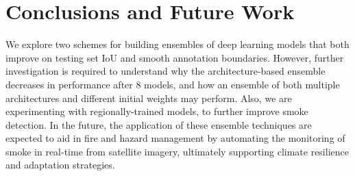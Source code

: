 \documentclass{article}
\begin{document}
\section{Conclusions and Future Work} We explore two schemes for building ensembles of deep learning models that both improve on testing set IoU and smooth annotation boundaries. However, further investigation is required to understand why the architecture-based ensemble decreases in performance after 8 models, and how an ensemble of both multiple architectures and different initial weights may perform. Also, we are experimenting with regionally-trained models, to further improve smoke detection. In the future, the application of these ensemble techniques are expected to aid in fire and hazard management by automating the monitoring of smoke in real-time from satellite imagery, ultimately supporting climate resilience and adaptation strategies. 


\end{document}
